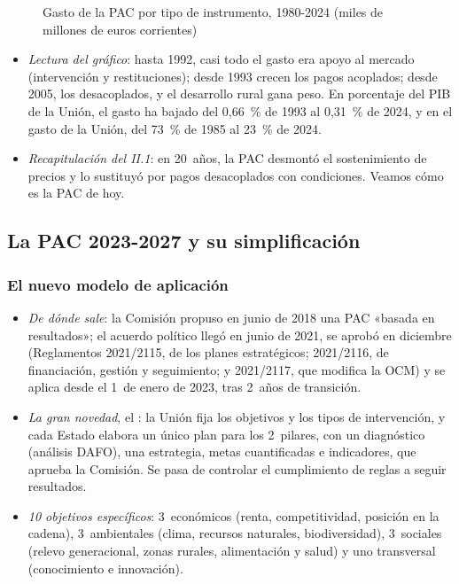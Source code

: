 \documentclass[11pt]{article}
\begin{document}
\begin{figure}[H]
\centering
\caption{Gasto de la PAC por tipo de instrumento, 1980-2024 (miles de millones de euros corrientes)}\label{fig:gasto-pac}
\end{figure}

\begin{itemize}
\item \emph{Lectura del gráfico}: hasta 1992, casi todo el gasto era apoyo al mercado (intervención y restituciones); desde 1993 crecen los pagos acoplados; desde 2005, los desacoplados, y el desarrollo rural gana peso. En porcentaje del PIB de la Unión, el gasto ha bajado del 0,66~\% de 1993 al 0,31~\% de 2024, y en el gasto de la Unión, del 73~\% de 1985 al 23~\% de 2024.
\item \emph{Recapitulación del II.1}: en 20~años, la PAC desmontó el sostenimiento de precios y lo sustituyó por pagos desacoplados con condiciones. Veamos cómo es la PAC de hoy.
\end{itemize}

\subsection{La PAC 2023-2027 y su simplificación}\label{sec:pac-actual}

\subsubsection{El nuevo modelo de aplicación}\label{sec:nuevo-modelo}

\begin{itemize}
\item \emph{De dónde sale}: la Comisión propuso en junio de 2018 una PAC «basada en resultados»; el acuerdo político llegó en junio de 2021, se aprobó en diciembre (Reglamentos 2021/2115, de los planes estratégicos; 2021/2116, de financiación, gestión y seguimiento; y 2021/2117, que modifica la OCM) y se aplica desde el 1~de enero de 2023, tras 2~años de transición\nocite{UE2021PlanesEstrategicos,UE2021Horizontal}.
\item \emph{La gran novedad}, el : la Unión fija los objetivos y los tipos de intervención, y cada Estado elabora un único plan para los 2~pilares, con un diagnóstico (análisis DAFO), una estrategia, metas cuantificadas e indicadores, que aprueba la Comisión. Se pasa de controlar el cumplimiento de reglas a seguir resultados.
\item \emph{10 objetivos específicos}: 3~económicos (renta, competitividad, posición en la cadena), 3~ambientales (clima, recursos naturales, biodiversidad), 3~sociales (relevo generacional, zonas rurales, alimentación y salud) y uno transversal (conocimiento e innovación)\nocite{UE2021PlanesEstrategicos}.
\end{itemize}
\end{document}
